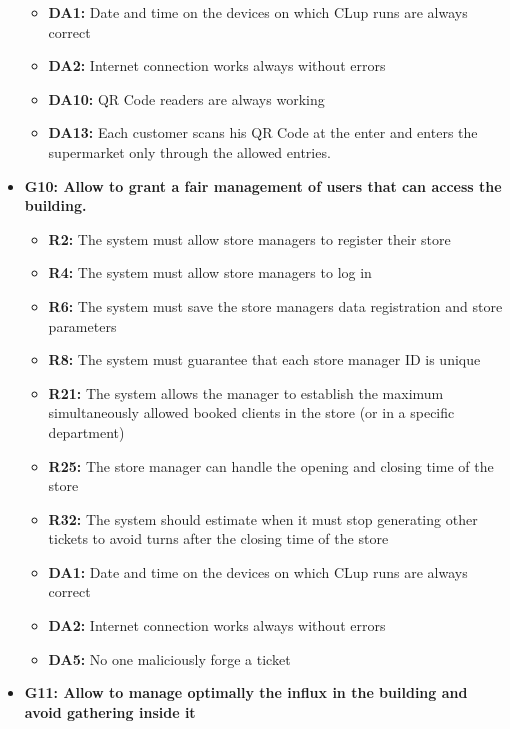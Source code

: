 \documentclass{article}
\begin{document}
\begin{itemize}
\begin{itemize}
			

				\item {\bfseries DA1:} Date and time on the devices on which CLup runs are always correct
				\item {\bfseries DA2:} Internet connection works always without errors
				\item {\bfseries DA10:} QR Code readers are always working
				\item {\bfseries DA13:} Each customer scans his QR Code at the enter and enters the supermarket only through the allowed entries.
				
				
				\end{itemize}

\item {\bfseries G10: Allow to grant a fair management of users that can access the building.}	

			\begin{itemize}
				\item {\bfseries R2:} The system must allow store managers to register their store
				\item {\bfseries R4:} The system must allow store managers to log in
				\item {\bfseries R6:} The system must save the store managers data registration and store parameters
				\item {\bfseries R8:} The system must guarantee that each store manager ID is unique
				\item {\bfseries R21:} The system allows the manager to establish the maximum simultaneously
allowed booked clients in the store (or in a specific department)
				\item {\bfseries R25:} The store manager can handle the opening and closing time of the store
				\item {\bfseries R32:} The system should estimate when it must stop generating other tickets to
avoid turns after the closing time of the store
				\item {\bfseries DA1:} Date and time on the devices on which CLup runs are always correct
				\item {\bfseries DA2:} Internet connection works always without errors
				\item {\bfseries DA5:} No one maliciously forge a ticket

				\end{itemize}

\item {\bfseries G11: Allow to manage optimally the influx in the building and avoid gathering inside it}	


\end{itemize}
\end{document}
